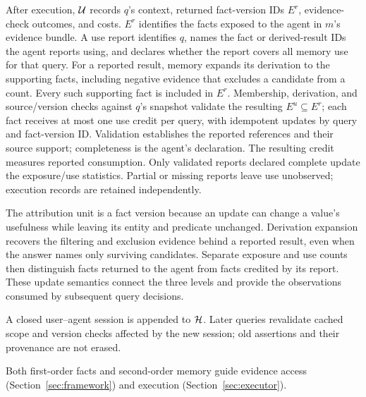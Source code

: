 After execution, $\mathcal{U}$ records $q$'s context, returned fact-version IDs
$E^r$, evidence-check outcomes, and costs. $E^r$ identifies the facts
exposed to the agent in $m$'s evidence bundle.
A use report identifies $q$, names the fact or derived-result IDs the
agent reports using, and declares whether the report covers all memory
use for that query. For a reported result, memory expands its derivation to the supporting
facts, including negative evidence that excludes a candidate from a
count. Every such supporting fact is included in $E^r$.
Membership, derivation, and source/version checks against $q$'s snapshot validate the resulting
$E^u\subseteq E^r$;
each fact receives at most one use credit per query, with idempotent
updates by query and fact-version ID. Validation establishes the reported
references and their source support; completeness is the agent's
declaration. The resulting credit measures reported consumption.
Only validated reports declared complete update the exposure/use
statistics. Partial or missing reports leave use unobserved; execution
records are retained independently.

The attribution unit is a fact version because an update can change a
value's usefulness while leaving its entity and predicate unchanged.
Derivation expansion recovers the filtering and exclusion evidence behind
a reported result, even when the answer names only surviving candidates.
Separate exposure and use counts then distinguish facts returned to the
agent from facts credited by its report. These update semantics
connect the three levels and provide the observations consumed by
subsequent query decisions.

A closed user--agent session is appended to $\mathcal{H}$. Later queries
revalidate cached scope and version checks affected by the new session;
old assertions and their provenance are not erased.

Both first-order facts and second-order memory guide evidence access
(Section~\ref{sec:framework}) and execution (Section~\ref{sec:executor}).
